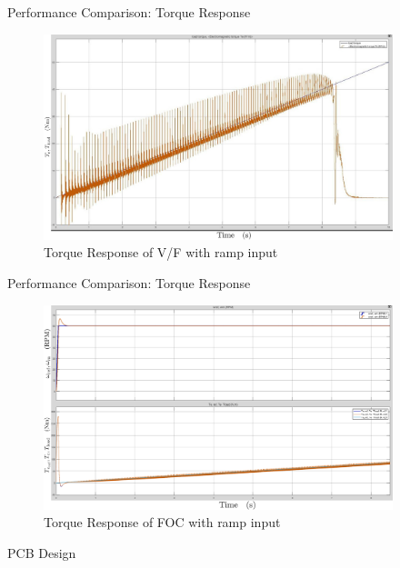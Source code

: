 \begin{frame}{Performance Comparison: Torque Response}
	\begin{figure}
		\includegraphics[width=4in]{conference/60rpmTorque.jpeg} %
		\caption{Torque Response of V/F with ramp input}
	\end{figure}
\end{frame}

\begin{frame}{Performance Comparison: Torque Response}
	\begin{figure}
		\includegraphics[width=4in]{conference/foc_60rpm.png} %
		\caption{Torque Response of FOC with ramp input}
	\end{figure}
\end{frame}




\begin{frame}{PCB Design}
	\begin{figure}
		\centering


	\end{figure}
\end{frame}


